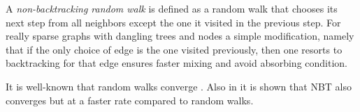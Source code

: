 \documentclass{article} %
\begin{document}

A \emph{non-backtracking random walk} is defined as a random walk that chooses its next step from all neighbors except the one it visited in the previous step. For really sparse graphs with dangling trees and nodes a simple modification, namely that if the only choice of edge is the one visited previously, then one resorts to backtracking for that edge ensures faster mixing and avoid absorbing condition.  


It is well-known that random walks converge \cite{Lovasz}. Also in \cite{NBT-Ihara,Alon} it is shown that NBT also converges but at a faster rate compared to random walks. 
\end{document}
